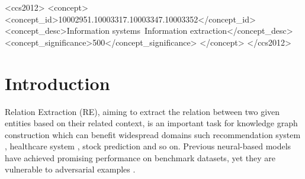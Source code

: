 \documentclass[sigconf]{acmart}
\begin{document}
\begin{CCSXML}
<ccs2012>
   <concept>
       <concept_id>10002951.10003317.10003347.10003352</concept_id>
       <concept_desc>Information systems~Information extraction</concept_desc>
       <concept_significance>500</concept_significance>
       </concept>
 </ccs2012>
\end{CCSXML}



\iffalse
\begin{teaserfigure}
  \texttt{[image: sampleteaser]}
  \caption{Seattle Mariners at Spring Training, 2010.}
  \Description{Enjoying the baseball game from the third-base
  seats. Ichiro Suzuki preparing to bat.}
  \label{fig:teaser}
\end{teaserfigure}
\fi
\maketitle



\section{Introduction} 
Relation Extraction (RE), aiming to extract the relation between two given entities based on their related context, is an important task for knowledge graph construction \cite{DBLP:conf/www/ZhangDSCZC20} which can benefit widespread domains such recommendation system \cite{DBLP:journals/jmpt/JiaZH20}, healthcare system \cite{DBLP:journals/corr/abs-2008-10813,DBLP:conf/emnlp/ZhangDLCZC20}, stock prediction \cite{DBLP:conf/www/DengZZCPC19} and so on. 
Previous neural-based models \cite{DBLP:conf/coling/ZengLLZZ14,zhang-etal-2018-attention,DBLP:conf/naacl/ZhangDSWCZC19,DBLP:conf/wsdm/DengZKZZC20,DBLP:conf/coling/LiWZZYC20,DBLP:journals/corr/abs-2009-07022,DBLP:conf/emnlp/ZhangDBYYCHZC20,DBLP:journals/corr/abs-2009-09841,DBLP:conf/coling/YuZDYZC20,DBLP:journals/corr/abs-2009-06207} have achieved promising performance on benchmark datasets, yet they are vulnerable to adversarial examples \cite{DBLP:conf/aaai/JinJZS20,DBLP:journals/tist/ZhangSAL20,DBLP:journals/corr/abs-2009-06206}. 
\end{document}
